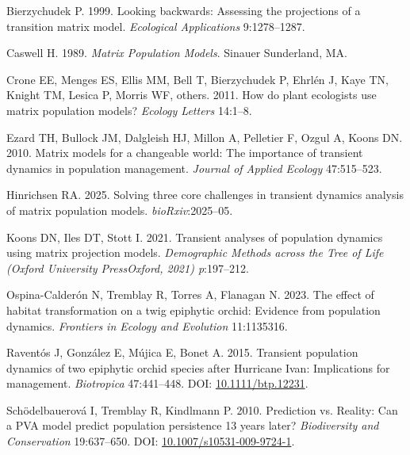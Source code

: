 \documentclass[
  12pt,
  letterpaper,
]{book}
\newlength{\cslhangindent}
\newenvironment{CSLReferences}[2] %
 {\begin{list}{}{%
  \setlength{\itemindent}{0pt}
  \setlength{\leftmargin}{0pt}
  \setlength{\parsep}{0pt}
  \ifodd #1
   \setlength{\leftmargin}{\cslhangindent}
   \setlength{\itemindent}{-1\cslhangindent}
  \fi
  \setlength{\itemsep}{#2\baselineskip}}}
 {\end{list}}
\begin{document}
\label{refs}
\begin{CSLReferences}{1}{0}
Bierzychudek P. 1999. Looking backwards: Assessing the projections of a
transition matrix model. \emph{Ecological Applications} 9:1278--1287.

Caswell H. 1989. \emph{Matrix {P}opulation {M}odels}. Sinauer
Sunderland, MA.

Crone EE, Menges ES, Ellis MM, Bell T, Bierzychudek P, Ehrlén J, Kaye
TN, Knight TM, Lesica P, Morris WF, others. 2011. How do plant
ecologists use matrix population models? \emph{Ecology Letters} 14:1--8.

Ezard TH, Bullock JM, Dalgleish HJ, Millon A, Pelletier F, Ozgul A,
Koons DN. 2010. Matrix models for a changeable world: The importance of
transient dynamics in population management. \emph{Journal of Applied
Ecology} 47:515--523.

Hinrichsen RA. 2025. Solving three core challenges in transient dynamics
analysis of matrix population models. \emph{bioRxiv}:2025--05.

Koons DN, Iles DT, Stott I. 2021. Transient analyses of population
dynamics using matrix projection models. \emph{Demographic Methods
across the Tree of Life (Oxford University PressOxford, 2021)
p}:197--212.

Ospina-Calderón N, Tremblay R, Torres A, Flanagan N. 2023. The effect of
habitat transformation on a twig epiphytic orchid: Evidence from
population dynamics. \emph{Frontiers in Ecology and Evolution}
11:1135316.

Raventós J, González E, Mújica E, Bonet A. 2015. Transient population
dynamics of two epiphytic orchid species after {H}urricane {I}van:
Implications for management. \emph{Biotropica} 47:441--448. DOI:
\href{https://doi.org/10.1111/btp.12231}{10.1111/btp.12231}.

Schödelbauerová I, Tremblay R, Kindlmann P. 2010. Prediction vs.
Reality: Can a PVA model predict population persistence 13 years later?
\emph{Biodiversity and Conservation} 19:637--650. DOI:
\href{https://doi.org/10.1007/s10531-009-9724-1}{10.1007/s10531-009-9724-1}.


\end{CSLReferences}
\end{document}
